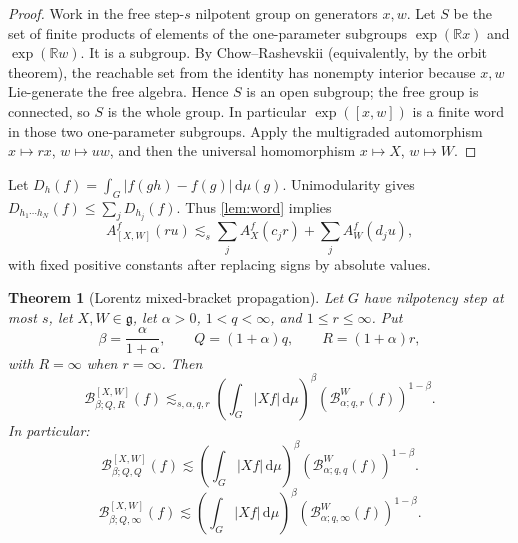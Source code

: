 \documentclass[11pt]{article}
\newtheorem{theorem}{Theorem}[section]
\theoremstyle{definition}
\theoremstyle{remark}
\newcommand{\R}{\mathbb R}
\newcommand{\g}{\mathfrak g}
\newcommand{\dd}{\,\mathrm d}
\newcommand{\abs}[1]{\lvert #1\rvert}
\newcommand{\A}[2]{A_{#1}^{#2}}
\newcommand{\B}[4]{\mathcal B^{#1}_{#2;#3,#4}}
\newcommand{\Bw}[3]{\mathcal B^{#1}_{#2;#3,\infty}}
\newcommand{\less}{\lesssim}
\begin{document}
\begin{proof}
Work in the free step-\(s\) nilpotent group on generators \(x,w\).  Let \(S\) be the
set of finite products of elements of the one-parameter subgroups \(\exp(\R x)\) and
\(\exp(\R w)\).  It is a subgroup.  By Chow--Rashevskii (equivalently, by the orbit
theorem), the reachable set from the identity has nonempty interior because \(x,w\)
Lie-generate the free algebra.  Hence \(S\) is an open subgroup; the free group is
connected, so \(S\) is the whole group.  In particular \(\exp([x,w])\) is a finite word in
those two one-parameter subgroups.  Apply the multigraded automorphism
\(x\mapsto rx\), \(w\mapsto uw\), and then the universal homomorphism
\(x\mapsto X\), \(w\mapsto W\).
\end{proof}

Let \(D_h(f)=\int_G\abs{f(gh)-f(g)}\dd\mu(g)\).  Unimodularity gives
\(D_{h_1\cdots h_N}(f)\le\sum_jD_{h_j}(f)\).  Thus \cref{lem:word} implies
\begin{equation}\label{eq:rectangle}
 \A{[X,W]}{f}(ru)
 \less_s\sum_j\A{X}{f}(c_jr)+\sum_j\A{W}{f}(d_ju),
\end{equation}
with fixed positive constants after replacing signs by absolute values.

\begin{theorem}[Lorentz mixed-bracket propagation]\label{thm:lorentz-mixed}
Let \(G\) have nilpotency step at most \(s\), let \(X,W\in\g\), let \(\alpha>0\),
\(1<q<\infty\), and \(1\le r\le\infty\).  Put
\begin{equation}\label{eq:betaQ}
 \beta=\frac{\alpha}{1+\alpha},\qquad Q=(1+\alpha)q,
 \qquad R=(1+\alpha)r,
\end{equation}
with \(R=\infty\) when \(r=\infty\).  Then
\begin{equation}\label{eq:lorentz-mixed}
 \B{[X,W]}{\beta}{Q}{R}(f)
 \less_{s,\alpha,q,r}
 \left(\int_G\abs{Xf}\dd\mu\right)^\beta
 \left(\B{W}{\alpha}{q}{r}(f)\right)^{1-\beta}.
\end{equation}
In particular:
\begin{equation}\label{eq:strongmixed}
 \B{[X,W]}{\beta}{Q}{Q}(f)
 \less
 \left(\int_G\abs{Xf}\dd\mu\right)^\beta
 \left(\B{W}{\alpha}{q}{q}(f)\right)^{1-\beta}.
\end{equation}
\begin{equation}\label{eq:weakmixed}
 \Bw{[X,W]}{\beta}{Q}(f)
 \less
 \left(\int_G\abs{Xf}\dd\mu\right)^\beta
 \left(\Bw{W}{\alpha}{q}(f)\right)^{1-\beta}.
\end{equation}
\end{theorem}
\end{document}
